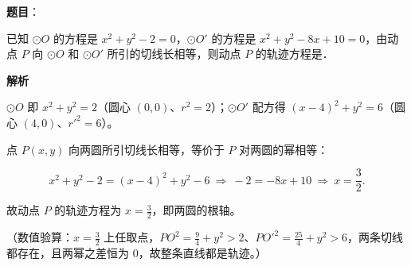 \begin{answer}

\textbf{题目}：

已知 $\odot O$ 的方程是 $x^2+y^2-2=0$，$\odot O'$ 的方程是 $x^2+y^2-8x+10=0$，由动点 $P$ 向 $\odot O$ 和 $\odot O'$ 所引的切线长相等，则动点 $P$ 的轨迹方程是\gkblank{}．

\textbf{解析}

$\odot O$ 即 $x^{2}+y^{2}=2$（圆心 $(0,0)$、$r^{2}=2$）；$\odot O'$ 配方得 $(x-4)^{2}+y^{2}=6$（圆心 $(4,0)$、$r'^{2}=6$）。

点 $P(x,y)$ 向两圆所引切线长相等，等价于 $P$ 对两圆的幂相等：

\nopagebreak[4]
\[x^{2}+y^{2}-2=(x-4)^{2}+y^{2}-6\ \Longrightarrow\ -2=-8x+10\ \Longrightarrow\ x=\frac32 .\]

故动点 $P$ 的轨迹方程为 $x=\frac32$，即两圆的根轴。

（数值验算：$x=\frac32$ 上任取点，$PO^{2}=\frac94+y^{2}>2$、$PO'^{2}=\frac{25}{4}+y^{2}>6$，两条切线都存在，且两幂之差恒为 $0$，故整条直线都是轨迹。）


\end{answer}
